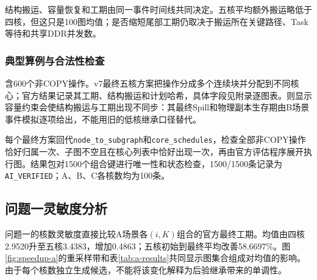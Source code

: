 结构搬运、容量恢复和工期由同一事件时间线共同决定。五核平均额外搬运略低于四核，但这只是100图均值；是否缩短尾部工期仍取决于搬运所在关键路径、Task等待和共享DDR并发数。

\subsubsection{典型算例与合法性检查}
含600个非COPY操作。v7最终五核方案把操作分成多个连续块并分配到不同核心；官方结果记录其工期、结构搬运和计划哈希，具体字段见附录逐图表。则显示容量约束会使结构搬运与工期出现不同步：其最终Spill和物理副本生存期由B场景事件模拟逐项给出，不能用旧的低核继承口径替代。

每个最终方案回代\texttt{node\_to\_subgraph}和\texttt{core\_schedules}，检查全部非COPY操作恰好归属一次、子图不空且在核心列表中恰好出现一次，再由官方评估程序展开执行图。结果包对1500个组合键进行唯一性和状态检查，1500/1500条记录为\texttt{AI\_VERIFIED}；A、B、C各核数均为100条。

\subsection{问题一灵敏度分析}
问题一的核数灵敏度直接比较A场景各$(i,K)$组合的官方最终工期。均值由四核2.9520升至五核3.4383，增加0.4863；五核初始到最终平均改善58.6697\%。图\ref{fig:speedup-a}的重采样带和表\ref{tab:a-results}共同显示图集合组成对均值的影响。由于每个核数独立生成候选，不能将该变化解释为后验继承带来的单调性。


